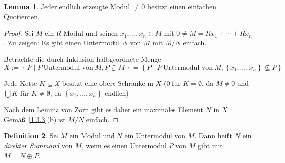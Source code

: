 \documentclass[
twoside=semi,
fontsize=12,
DIV=12, 
cleardoublepage=current,
leqno,
headings=optiontoheadandtoc, 
toc=idx
]{scrbook}
\newcommand{\set}[1]{\left\{ #1 \right\}}
\theoremstyle{definition}
\newtheorem{definition}{Definition}[section]
\newtheorem{lemma}[definition]{Lemma}
\begin{document}
	\begin{lemma}\label{1.3.8}\hfill\newline
		Jeder endlich erzeugte Modul $\neq 0$ besitzt einen einfachen Quotienten.
		
		\begin{proof}
			Sei $M$ ein $R$-Modul und seinen $x_1, \dots, x_n \in M$ mit $0 \neq M = Rx_1 + \cdots + Rx_n$. Zu zeigen: Es gibt einen Untermodul $N$ von $M$ mit $M/N$ einfach.
			
			\noindent Betrachte die durch Inklusion halbgeordnete Menge 
				\[X:=\set{P \mid P\ \textrm{Untermodul von} \ M, P \subsetneq M} = \set{P \mid P\ \textrm{Untermodul von} \ M, \set{x_1, \dots, x_n} \nsubseteq P}\]
			
			\noindent Jede Kette $K \subseteq X$ besitzt eine obere Schranke in $X$ ($0$ f\"ur $K = \emptyset$, da $M \neq 0$ und $\bigcup K$ f\"ur $K \neq \emptyset$, da $\set{x_1, \dots, x_n}$ endlich)
			
			\noindent Nach dem Lemma von Zorn gibt es daher ein maximales Element $N$ in $X$. Gem\"a\ss \ \ref{1.3.3}(b) ist $M/N$ einfach. 
		\end{proof}
	\end{lemma}

	\begin{definition}\label{1.3.9}\hfill\newline
		Sei $M$ ein Modul und $N$ ein Untermodul von $M$. Dann hei\ss t $N$ ein \emph{direkter Summand} von $M$, wenn es einen Untermodul $P$ von $M$ gibt mit $M = N \oplus P$.
	\end{definition}
\end{document}
